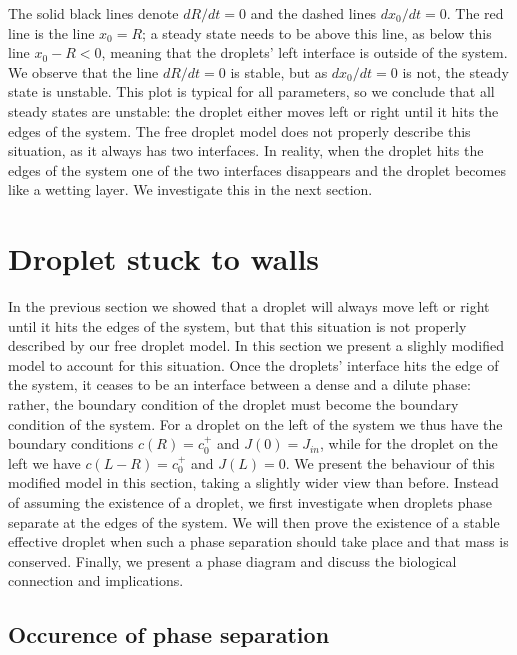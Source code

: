 \documentclass{Dissertate}
\begin{document}
The solid black lines denote \(dR/dt=0\) and the dashed lines
\(dx_0/dt=0\). The red line is the line \(x_0=R\); a steady state needs
to be above this line, as below this line \(x_0-R<0\), meaning that the
droplets' left interface is outside of the system. We observe that the
line \(dR/dt=0\) is stable, but as \(dx_0/dt=0\) is not, the steady
state is unstable. This plot is typical for all parameters, so we
conclude that all steady states are unstable: the droplet either moves
left or right until it hits the edges of the system. The free droplet
model does not properly describe this situation, as it always has two
interfaces. In reality, when the droplet hits the edges of the system
one of the two interfaces disappears and the droplet becomes like a
wetting layer. We investigate this in the next section.

\hypertarget{droplet-stuck-to-walls}{%
\section{Droplet stuck to walls}\label{droplet-stuck-to-walls}}

In the previous section we showed that a droplet will always move left
or right until it hits the edges of the system, but that this situation
is not properly described by our free droplet model. In this section we
present a slighly modified model to account for this situation. Once the
droplets' interface hits the edge of the system, it ceases to be an
interface between a dense and a dilute phase: rather, the boundary
condition of the droplet must become the boundary condition of the
system. For a droplet on the left of the system we thus have the
boundary conditions \(c(R)=c_0^+\) and \(J(0)=J_{in}\), while for the
droplet on the left we have \(c(L-R)=c_0^+\) and \(J(L)=0\). We present
the behaviour of this modified model in this section, taking a slightly
wider view than before. Instead of assuming the existence of a droplet,
we first investigate when droplets phase separate at the edges of the
system. We will then prove the existence of a stable effective droplet
when such a phase separation should take place and that mass is
conserved. Finally, we present a phase diagram and discuss the
biological connection and implications.

\hypertarget{occurence-of-phase-separation}{%
\subsection{Occurence of phase
separation}\label{occurence-of-phase-separation}}
\end{document}

